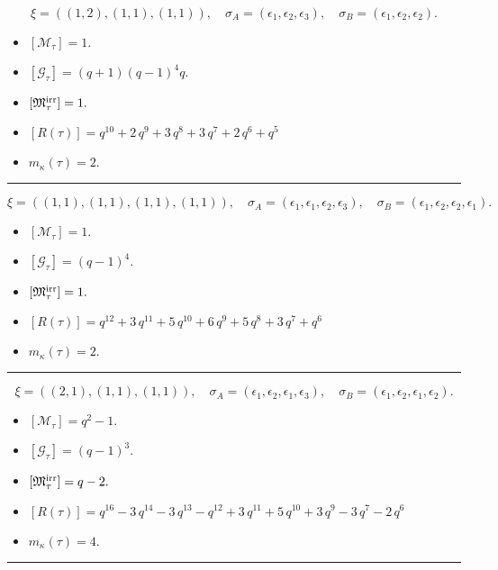 \documentclass[10pt,a4paper]{amsart}
\begin{document}
$$\xi = ({(1, 2), (1, 1), (1, 1)}),\quad \sigma_A = ({{\epsilon_1}, {\epsilon_2}, {\epsilon_3}}),\quad \sigma_B = ({{\epsilon_1}, {\epsilon_2}, {\epsilon_2}}).$$

\begin{itemize}
 \item $[\mathcal{M}_{\tau}] = 1 .$

 \item $[\mathcal{G}_{\tau}] = {\left(q + 1\right)} {\left(q - 1\right)}^{4} q .$

 \item $[{\frak M}_{\tau}^{\textrm{irr}}] = 1 .$

 \item $[R(\tau)] = q^{10} + 2 \, q^{9} + 3 \, q^{8} + 3 \, q^{7} + 2 \, q^{6} + q^{5} $

 \item $m_{\kappa}(\tau) = 2 .$

 \end{itemize}
\noindent\rule{8cm}{0.4pt}

$$\xi = ({(1, 1), (1, 1), (1, 1), (1, 1)}),\quad \sigma_A = ({{\epsilon_1}, {\epsilon_1}, {\epsilon_2}, {\epsilon_3}}),\quad \sigma_B = ({{\epsilon_1}, {\epsilon_2}, {\epsilon_2}, {\epsilon_1}}).$$

\begin{itemize}
 \item $[\mathcal{M}_{\tau}] = 1 .$

 \item $[\mathcal{G}_{\tau}] = {\left(q - 1\right)}^{4} .$

 \item $[{\frak M}_{\tau}^{\textrm{irr}}] = 1 .$

 \item $[R(\tau)] = q^{12} + 3 \, q^{11} + 5 \, q^{10} + 6 \, q^{9} + 5 \, q^{8} + 3 \, q^{7} + q^{6} $

 \item $m_{\kappa}(\tau) = 2 .$

 \end{itemize}
\noindent\rule{8cm}{0.4pt}

$$\xi = ({(2, 1), (1, 1)}, {(1, 1)}),\quad \sigma_A = ({{\epsilon_1, \epsilon_2}, {\epsilon_1}}, {{\epsilon_3}}),\quad \sigma_B = ({{\epsilon_1, \epsilon_2}, {\epsilon_1}}, {{\epsilon_2}}).$$

\begin{itemize}
 \item $[\mathcal{M}_{\tau}] = q^{2} - 1 .$

 \item $[\mathcal{G}_{\tau}] = {\left(q - 1\right)}^{3} .$

 \item $[{\frak M}_{\tau}^{\textrm{irr}}] = q - 2 .$

 \item $[R(\tau)] = q^{16} - 3 \, q^{14} - 3 \, q^{13} - q^{12} + 3 \, q^{11} + 5 \, q^{10} + 3 \, q^{9} - 3 \, q^{7} - 2 \, q^{6} $

 \item $m_{\kappa}(\tau) = 4 .$

 \end{itemize}
\noindent\rule{8cm}{0.4pt}
\end{document}
